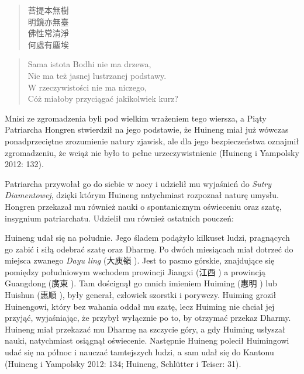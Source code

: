 \begin{minipage}[t]{0.38\textwidth}
\begin{verse}
菩提本無樹\\
明鏡亦無臺\\
佛性常清淨\\
何處有塵埃
\end{verse}
\end{minipage}
\begin{minipage}[t]{0.62\textwidth}
\itshape
\begin{verse}
Sama istota Bodhi nie ma drzewa,\\
Nie ma też jasnej lustrzanej podstawy.\\
W rzeczywistości nie ma niczego,\\
Cóż miałoby przyciągać jakikolwiek kurz?
\end{verse}
\end{minipage}
\label{HuinengVerse}
\vspace*{1em}

Mnisi ze zgromadzenia byli pod wielkim wrażeniem tego wiersza, a Piąty Patriarcha Hongren stwierdził na jego podstawie, że Huineng miał już wówczas ponadprzeciętne zrozumienie natury zjawisk, ale dla jego bezpieczeństwa oznajmił zgromadzeniu, że wciąż nie było to pełne urzeczywistnienie
(Huineng i Yampolsky 2012: 132).

Patriarcha przywołał go do siebie w nocy i udzielił mu wyjaśnień do \textit{Sutry Diamentowej}, dzięki którym Huineng natychmiast rozpoznał naturę umysłu.
Hongren przekazał mu również nauki o spontanicznym oświeceniu oraz szatę, insygnium patriarchatu. Udzielił mu również ostatnich pouczeń:

Huineng udał się na południe. Jego śladem podążyło kilkuset ludzi, pragnących go zabić i siłą odebrać szatę oraz Dharmę. Po dwóch miesiącach miał dotrzeć do miejsca zwanego \textit{Dayu ling} (大庾嶺 ). Jest to pasmo górskie, znajdujące się pomiędzy południowym wschodem prowincji Jiangxi (江西 ) a prowincją Guangdong (廣東 ). Tam doścignął go mnich imieniem Huiming (惠明 ) lub Huishun (惠順 ), były generał, człowiek szorstki i porywczy. Huiming groził Huinengowi, który bez wahania oddał mu szatę, lecz Huiming nie chciał jej przyjąć, wyjaśniając, że przybył wyłącznie po to, by otrzymać przekaz Dharmy. Huineng miał przekazać mu Dharmę na szczycie góry, a gdy Huiming usłyszał nauki, natychmiast osiągnął oświecenie.
Następnie Huineng polecił Huimingowi udać się na północ i nauczać tamtejszych ludzi, a sam udał się do Kantonu (Huineng i Yampolsky 2012: 134; Huineng, Schlütter i Teiser: 31).

